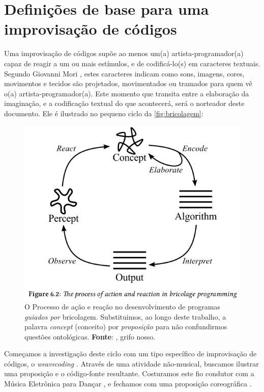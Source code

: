 \chapter{Definições de base para uma improvisação de códigos}\label{cap:introducao}

Uma improvisação de códigos supõe ao menos um(a) artista-programador(a) capaz de reagir a um ou mais estímulos, e de codificá-lo(s) em caracteres textuais. Segundo Giovanni Mori , estes caracteres indicam como sons, imagens, cores, movimentos e tecidos são projetados, movimentados ou tramados  para quem vê o(a) artista-programador(a). Este momento que transita entre a elaboração da imaginação, e a codificação textual do que acontecerá, será o norteador deste documento. Ele é ilustrado no pequeno ciclo da \autoref{fig:bricolagem}:

\begin{figure}[!h]
  \centering
  \includegraphics[scale=0.5]{./imagens/processo_criativo.png}
  \caption{O Processo de ação e reação no desenvolvimento de programas \emph{guiados por} bricolagem. Substituimos, ao longo deste trabalho, a palavra \emph{concept} (conceito) por \emph{proposição} para não confundirmos questões ontológicas. \textbf{Fonte}: \cite[p.~122]{McLean2011}, grifo nosso.}
  \label{fig:bricolagem}
\end{figure}

Começamos a investigação deste ciclo com um tipo específico de improvisação de códigos, o \emph{weavecoding} . Através de uma atividade  não-musical, buscamos ilustrar uma proposição e o código-fonte resultante. Costuramos este fio condutor com a Música Eletrônica para Dançar , e fechamos com uma proposição coreográfica .



